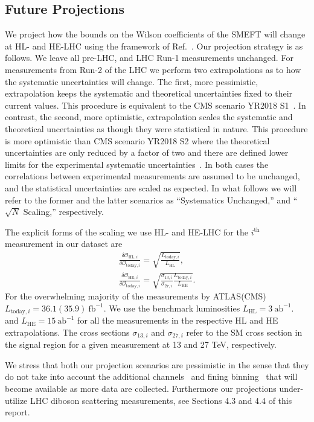 \documentclass[../report.tex]{subfiles}
\begin{document}
\subsection{Future Projections}
We project how the bounds on the Wilson coefficients of the SMEFT will change at HL- and HE-LHC using the framework of Ref.~\cite{Ellis:2018gqa}.
Our projection strategy is as follows.
We leave all pre-LHC, and LHC Run-1 measurements unchanged.
For measurements from Run-2 of the LHC we perform two extrapolations as to how the systematic uncertainties will change.
The first, more pessimistic, extrapolation keeps the systematic and theoretical uncertainties fixed to their current values.
This procedure is equivalent to the CMS scenario YR2018 S1~\cite{gilbert:talk}. 
In contrast, the second, more optimistic, extrapolation scales the systematic and theoretical uncertainties as though they were statistical in nature.
This procedure is more optimistic than CMS scenario YR2018 S2 where the theoretical uncertainties are only reduced by a factor of two and there are defined lower limits for the experimental systematic uncertainties~\cite{gilbert:talk}.
In both cases the correlations between experimental measurements are assumed to be unchanged, and the statistical uncertainties are scaled as expected.
In what follows we will refer to the former and the latter scenarios as ``Systematics Unchanged,'' and ``$\sqrt{N}$ Scaling,'' respectively.

The explicit forms of the scaling we use HL- and HE-LHC for the $i^{\text{th}}$ measurement in our dataset are 
\begin{align}
\frac{\delta\mathcal{O}_{\text{HL}, i}}{\delta\mathcal{O}_{\text{today}, i}} = \sqrt{\frac{L_{\text{today}, i}}{L_{\text{HL}}}} , \\
\frac{\delta\mathcal{O}_{\text{HE}, i}}{\delta\mathcal{O}_{\text{today}, i}} = \sqrt{\frac{\sigma_{13, i}}{\sigma_{27, i}} \frac{L_{\text{today}, i}}{L_{\text{HE}}}}  . \nonumber
\end{align}
For the overwhelming majority of the measurements by ATLAS(CMS) $L_{\text{today}, i} = 36.1(35.9)~\text{fb}^{-1}$.
We use the benchmark luminosities $L_{\text{HL}} = 3~\text{ab}^{-1}$. and $L_{\text{HE}} = 15~\text{ab}^{-1}$ for all the measurements in the respective HL and HE extrapolations.
The cross sections $\sigma_{13, i}$ and $\sigma_{27, i}$ refer to the SM cross section in the signal region for a given measurement at 13 and 27 TeV, respectively.

We stress that both our projection scenarios are pessimistic in the sense that they do not take into account the additional channels~\cite{gilbert:talk} and fining binning~\cite{deFlorian:2016spz, Hays:2290628, ATLAS-CONF-2017-047} that will become available as more data are collected.
Furthermore our projections under-utilize LHC diboson scattering measurements, see Sections 4.3 and 4.4 of this report. 
\end{document}
